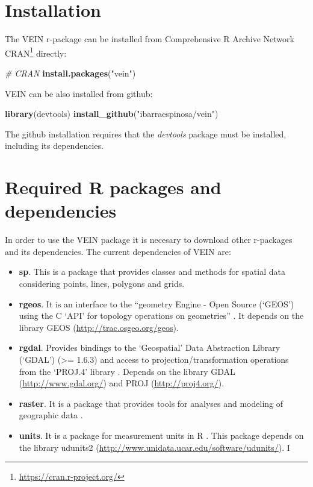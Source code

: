 \documentclass[12pt,graybox,envcountchap,sectrefs]{krantz}
\makeatletter
\newenvironment{Shaded}{\begin{snugshade}}{\end{snugshade}}
\newcommand{\KeywordTok}[1]{\textcolor[rgb]{0.13,0.29,0.53}{\textbf{#1}}}
\newcommand{\StringTok}[1]{\textcolor[rgb]{0.31,0.60,0.02}{#1}}
\newcommand{\CommentTok}[1]{\textcolor[rgb]{0.56,0.35,0.01}{\textit{#1}}}
\newcommand{\NormalTok}[1]{#1}
\providecommand{\tightlist}{%
  \setlength{\itemsep}{0pt}\setlength{\parskip}{0pt}}
\renewcommand{\href}[2]{#2\footnote{\url{#1}}}
\newenvironment{kframe}{%
\medskip{}
\setlength{\fboxsep}{.8em}
 \def\at@end@of@kframe{}%
 \ifinner\ifhmode%
  \def\at@end@of@kframe{\end{minipage}}%
  \begin{minipage}{\columnwidth}%
 \fi\fi%
 \def\FrameCommand##1{\hskip\@totalleftmargin \hskip-\fboxsep
 \colorbox{shadecolor}{##1}\hskip-\fboxsep
     \hskip-\linewidth \hskip-\@totalleftmargin \hskip\columnwidth}%
 \MakeFramed {\advance\hsize-\width
   \@totalleftmargin\z@ \linewidth\hsize
   \@setminipage}}%
 {\par\unskip\endMakeFramed%
 \at@end@of@kframe}
\renewenvironment{Shaded}{\begin{kframe}}{\end{kframe}}
\theoremstyle{definition}
\theoremstyle{definition}
\theoremstyle{definition}
\theoremstyle{remark}
\makeatother
\begin{document}
\section{Installation}\label{installation}

The VEIN r-package can be installed from Comprehensive R Archive Network
\href{https://cran.r-project.org/}{CRAN} directly:

\begin{Shaded}
\begin{Highlighting}[]
\CommentTok{# CRAN}
\KeywordTok{install.packages}\NormalTok{(}\StringTok{"vein"}\NormalTok{)}
\end{Highlighting}
\end{Shaded}

VEIN can be also installed from github:

\begin{Shaded}
\begin{Highlighting}[]
\KeywordTok{library}\NormalTok{(devtools)}
\KeywordTok{install_github}\NormalTok{(}\StringTok{"ibarraespinosa/vein"}\NormalTok{)}
\end{Highlighting}
\end{Shaded}

The github installation requires that the \emph{devtools} package
\citep{devtools} must be installed, including its dependencies.

\section{Required R packages and
dependencies}\label{required-r-packages-and-dependencies}

In order to use the VEIN package it is necesary to download other
r-packages and its dependencies. The current dependencies of VEIN are:

\begin{itemize}
\tightlist
\item
  \textbf{sp}. This is a package that provides classes and methods for
  spatial data \citep{sp} considering points, lines, polygons and grids.
\item
  \textbf{rgeos}. It is an interface to the ``geometry Engine - Open
  Source (`GEOS') using the C `API' for topology operations on
  geometries'' \citep{rgeos}. It depends on the library GEOS
  (\url{http://trac.osgeo.org/geos}).
\item
  \textbf{rgdal}. Provides bindings to the `Geospatial' Data Abstraction
  Library (`GDAL') (\textgreater{}= 1.6.3) and access to
  projection/transformation operations from the `PROJ.4' library
  \citep{rgdal}. Depends on the library GDAL
  (\url{http://www.gdal.org/}) and PROJ (\url{http://proj4.org/}).
\item
  \textbf{raster}. It is a package that provides tools for analyses and
  modeling of geographic data \citep{raster}.
\item
  \textbf{units}. It is a package for measurement units in R
  \citep{units}. This package depends on the library udunits2
  (\url{http://www.unidata.ucar.edu/software/udunits/}). I
\end{itemize}
\end{document}
